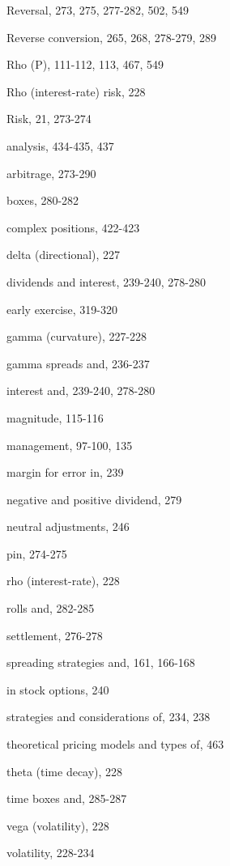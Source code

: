 \noindent Reversal, 273, 275, 277-282, 502, 549\par
\noindent Reverse conversion, 265, 268, 278-279, 289\par
\noindent Rho (P), 111-112, 113, 467, 549\par
\noindent Rho (interest-rate) risk, 228\par
\noindent Risk, 21, 273-274\par
\noindent analysis, 434-435, 437\par
\noindent arbitrage, 273-290\par
\noindent boxes, 280-282\par
\noindent complex positions, 422-423\par
\noindent delta (directional), 227\par
\noindent dividends and interest, 239-240, 278-280\par
\noindent early exercise, 319-320\par
\noindent gamma (curvature), 227-228\par
\noindent gamma spreads and, 236-237\par
\noindent interest and, 239-240, 278-280\par
\noindent magnitude, 115-116\par
\noindent management, 97-100, 135\par
\noindent margin for error in, 239\par
\noindent negative and positive dividend, 279\par
\noindent neutral adjustments, 246\par
\noindent pin, 274-275\par
\noindent rho (interest-rate), 228\par
\noindent rolls and, 282-285\par
\noindent settlement, 276-278\par
\noindent spreading strategies and, 161, 166-168\par
\noindent in stock options, 240\par
\noindent strategies and considerations of, 234, 238\par
\noindent theoretical pricing models and types of, 463\par
\noindent theta (time decay), 228\par
\noindent time boxes and, 285-287\par
\noindent vega (volatility), 228\par
\noindent volatility, 228-234\par

